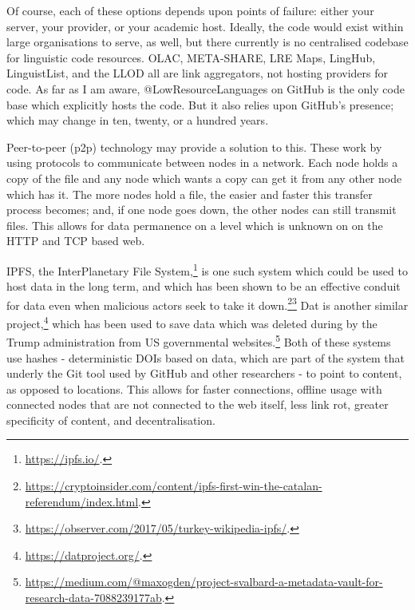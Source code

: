 Of course, each of these options depends upon points of failure: either your server, your provider, or your academic host. Ideally, the code would exist within large organisations to serve, as well, but there currently is no centralised codebase for linguistic code resources. OLAC, META-SHARE, LRE Maps, LingHub, LinguistList, and the LLOD all are link aggregators, not hosting providers for code. As far as I am aware, @LowResourceLanguages on GitHub is the only code base which explicitly hosts the code. But it also relies upon GitHub's presence; which may change in ten, twenty, or a hundred years.

Peer-to-peer (p2p) technology may provide a solution to this. These work by using protocols to communicate between nodes in a network. Each node holds a copy of the file and any node which wants a copy can get it from any other node which has it. The more nodes hold a file, the easier and faster this transfer process becomes; and, if one node goes down, the other nodes can still transmit files. This allows for data permanence on a level which is unknown on on the HTTP and TCP based web.

IPFS, the InterPlanetary File System,\footnote{\href{https://ipfs.io/}{https://ipfs.io/}. } is one such system which could be used to host data in the long term, and which has been shown to be an effective conduit for data even when malicious actors seek to take it down.\footnote{\href{https://cryptoinsider.com/content/ipfs-first-win-the-catalan-referendum/index.html}{https://cryptoinsider.com/content/ipfs-first-win-the-catalan-referendum/index.html}. }\footnote{\href{https://observer.com/2017/05/turkey-wikipedia-ipfs/}{https://observer.com/2017/05/turkey-wikipedia-ipfs/}. } Dat is another similar project,\footnote{\href{https://datproject.org/}{https://datproject.org/}. } which has been used to save data which was deleted during by the Trump administration from US governmental websites.\footnote{\href{https://medium.com/@maxogden/project-svalbard-a-metadata-vault-for-research-data-7088239177ab}{https://medium.com/@maxogden/project-svalbard-a-metadata-vault-for-research-data-7088239177ab}. } Both of these systems use hashes - deterministic DOIs based on data, which are part of the system that underly the Git tool used by GitHub and other researchers - to point to content, as opposed to locations. This allows for faster connections, offline usage with connected nodes that are not connected to the web itself, less link rot, greater specificity of content, and decentralisation.

